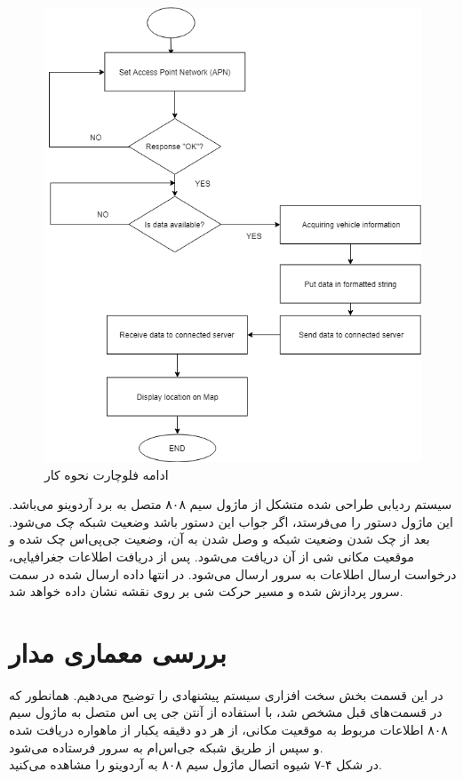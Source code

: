 \begin{figure}[!h]
	\centerline{\includegraphics[width=.9\textwidth]{continue-gsm}}
	\caption{ادامه فلوچارت نحوه کار  \cite{ElShafee2013}}
\end{figure}


سیستم ردیابی طراحی شده متشکل از ماژول سیم ۸۰۸ متصل به برد آردوینو می‌باشد. این ماژول دستور  را می‌فرستد، اگر جواب این دستور  باشد وضعیت شبکه چک می‌شود. بعد از چک شدن وضعیت شبکه و وصل شدن به آن، وضعیت جی‌پی‌اس چک شده و موقعیت مکانی شی از آن دریافت می‌شود. پس از دریافت اطلاعات جغرافیایی، درخواست ارسال اطلاعات به سرور ارسال می‌شود. در انتها داده ارسال شده در سمت سرور پردازش شده و مسیر حرکت شی بر روی نقشه نشان داده خواهد شد.
\\
\section{بررسی معماری مدار}
در این قسمت بخش سخت‌ افزاری سیستم پیشنهادی را توضیح می‌دهیم. همانطور که در قسمت‌های قبل مشخص شد، با استفاده از آنتن جی‌ پی اس متصل به ماژول سیم ۸۰۸ اطلاعات مربوط به موقعیت مکانی، از هر دو دقیقه یکبار از ماهواره دریافت شده و سپس از طریق شبکه جی‌اس‌ام به سرور فرستاده می‌شود. \\
در شکل ۴-۷ شیوه اتصال ماژول سیم ۸۰۸ به آردوینو را مشاهده می‌کنید.\\


